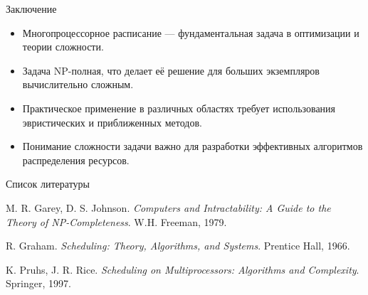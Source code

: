 \documentclass{beamer}
\begin{document}
\begin{frame}{Заключение}
    \begin{itemize}
        \item Многопроцессорное расписание — фундаментальная задача в оптимизации и теории сложности.
        \item Задача NP-полная, что делает её решение для больших экземпляров вычислительно сложным.
        \item Практическое применение в различных областях требует использования эвристических и приближенных методов.
        \item Понимание сложности задачи важно для разработки эффективных алгоритмов распределения ресурсов.
    \end{itemize}
\end{frame}

\begin{frame}{Список литературы}
    \begin{thebibliography}{9}
        M. R. Garey, D. S. Johnson. \textit{Computers and Intractability: A Guide to the Theory of NP-Completeness}. W.H. Freeman, 1979.
        
        R. Graham. \textit{Scheduling: Theory, Algorithms, and Systems}. Prentice Hall, 1966.
        
        K. Pruhs, J. R. Rice. \textit{Scheduling on Multiprocessors: Algorithms and Complexity}. Springer, 1997.
    \end{thebibliography}
\end{frame}
\end{document}
